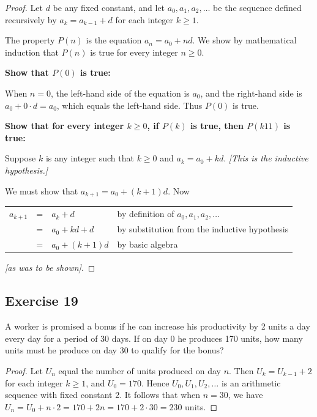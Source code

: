 \documentclass[14pt]{extarticle}
\newcommand{\cy}{\color{cyan}}
\begin{document}
\begin{proof}
Let $d$ be any fixed constant, and let \(a_0, a_1, a_2, \ldots\) be the sequence defined recursively by 
\(a_k = a_{k-1} + d\) for each integer \(k \geq 1\).

The property $P(n)$ is the equation \(a_n = a_0 + nd\). 
We show by mathematical induction that $P(n)$ is true for every integer \(n \geq 0\).

{\bf Show that \(P(0)\) is true:}

When $n = 0$, the left-hand side of the equation is $a_0$, and the right-hand side is \(a_0 + 0 \cdot d = a_0\), 
which equals the left-hand side. Thus $P(0)$ is true. 

{\bf Show that for every integer \(k \geq 0\), if \(P(k)\) is true, then \(P(k 1 1)\) is true:}

Suppose $k$ is any integer such that \(k \geq 0\) and \(a_k = a_0 + kd\). {\it [This is the inductive hypothesis.]}

We must show that \(a_{k+1} = a_0 + (k + 1)d\). Now

\begin{tabular}{rcll}
\(a_{k+1}\) & = & \(a_k + d\) & {\cy by definition of \(a_0, a_1, a_2, \ldots\)} \\
& = & \(a_0 + kd + d\) & {\cy by substitution from the inductive hypothesis} \\
& = & \(a_0 + (k + 1)d\) & {\cy by basic algebra}
\end{tabular}

{\it [as was to be shown]}.
\end{proof}

\subsection{Exercise 19}
A worker is promised a bonus if he can increase his productivity by 2 units a day every day for a period of 30 
days. If on day 0 he produces 170 units, how many units must he produce on day 30 to qualify for the bonus?

\begin{proof}
Let \(U_n\) equal the number of units produced on day $n$. Then \(U_k = U_{k-1} + 2\) for each integer \(k \geq 1\), 
and \(U_0 = 170\). Hence \(U_0, U_1, U_2, \ldots\) is an arithmetic sequence with fixed constant 2. It follows that 
when \(n = 30\), we have \(U_n = U_0 + n \cdot 2 = 170 + 2n = 170 + 2 \cdot 30 = 230\) units.
\end{proof}
\end{document}
